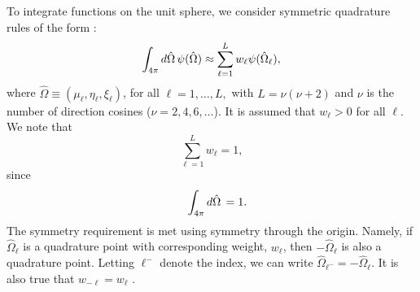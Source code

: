 To integrate functions on the unit sphere, we consider symmetric quadrature rules of the form \cite{carlson1965transport}:
\begin{equation}
	\int_{4\pi} \mathop{}\!d \hat{\Omega} \, \psi(\hat{\Omega}) \approx \sum_{\ell = 1}^{L} w_{\ell} \psi(\hat{\Omega}_{\ell}),
\end{equation}
where $\hat{\Omega} \equiv (\mu_{\ell}, \eta_{\ell}, \xi_{\ell})$, for all $\ell = 1, \dots, L,$ with $L = \nu(\nu+2)$ and $\nu$ is the number of direction cosines ($\nu = 2, 4, 6, \dots$). It is assumed that $w_{\ell} > 0$ for all $\ell$. We note that
\begin{equation}
\sum_{\ell = 1}^{L} w_{\ell} = 1,
\end{equation}
since
\begin{equation}
\quad \int_{4\pi} \mathop{}\!d \hat{\Omega} \, = 1.
\end{equation}
The symmetry requirement is met using symmetry through the origin. Namely, if $\hat{\Omega}_{\ell}$ is a quadrature point with corresponding weight, $w_{\ell}$, then $-\hat{\Omega}_{\ell}$ is also a quadrature point. Letting $\ell^{-}$ denote the index, we can write $\hat{\Omega}_{\ell^{-}} = -\hat{\Omega}_{\ell}$. It is also true that $w_{-\ell} = w_{\ell}$ \cite{carlson1965transport}.

